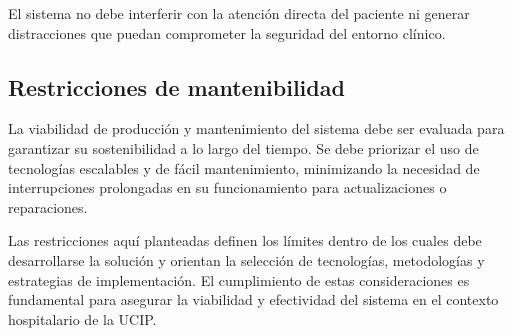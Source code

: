 El sistema no debe interferir con la atención directa del paciente ni generar distracciones que puedan comprometer la seguridad del entorno clínico. 

\medskip

\subsection{Restricciones de mantenibilidad}

La viabilidad de producción y mantenimiento del sistema debe ser evaluada para garantizar su sostenibilidad a lo largo del tiempo. Se debe priorizar el uso de tecnologías escalables y de fácil mantenimiento, minimizando la necesidad de interrupciones prolongadas en su funcionamiento para actualizaciones o reparaciones.

Las restricciones aquí planteadas definen los límites dentro de los cuales debe desarrollarse la solución y orientan la selección de tecnologías, metodologías y estrategias de implementación. El cumplimiento de estas consideraciones es fundamental para asegurar la viabilidad y efectividad del sistema en el contexto hospitalario de la UCIP.

